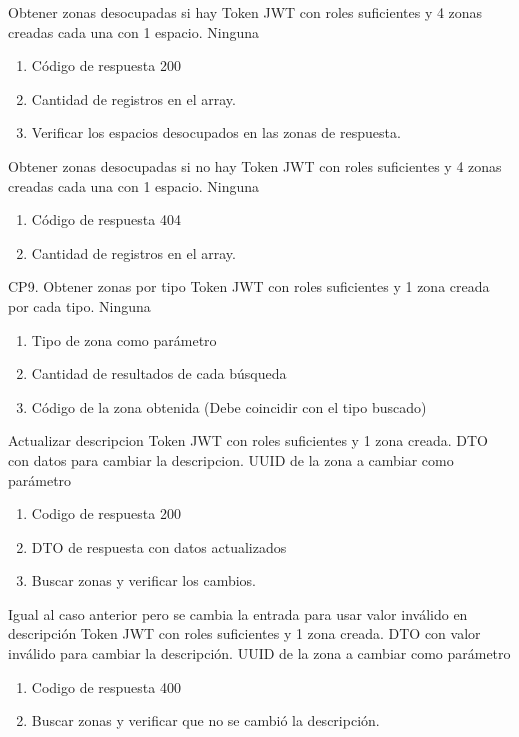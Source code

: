 {Obtener zonas desocupadas si hay}
{Token JWT con roles suficientes y 4 zonas creadas cada una con 1 espacio.}
{Ninguna}
{\begin{enumerate} [leftmargin=*, nosep]
    \item Código de respuesta 200
    \item Cantidad de registros en el array.
    \item Verificar los espacios desocupados en las zonas de respuesta.
\end{enumerate}}

{Obtener zonas desocupadas si no hay}
{Token JWT con roles suficientes y 4 zonas creadas cada una con 1 espacio.}
{Ninguna}
{\begin{enumerate} [leftmargin=*, nosep]
    \item Código de respuesta 404
    \item Cantidad de registros en el array.
\end{enumerate}}

{CP9. Obtener zonas por tipo}
{Token JWT con roles suficientes y 1 zona creada por cada tipo.}
{Ninguna}
{\begin{enumerate} [leftmargin=*, nosep]
    \item Tipo de zona como parámetro
    \item Cantidad de resultados de cada búsqueda
    \item Código de la zona obtenida (Debe coincidir con el tipo buscado)
\end{enumerate}}

{Actualizar descripcion}
{Token JWT con roles suficientes y 1 zona creada.}
{DTO con datos para cambiar la descripcion. UUID de la zona a cambiar como parámetro}
{\begin{enumerate} [leftmargin=*, nosep]
    \item Codigo de respuesta 200
    \item DTO de respuesta con datos actualizados
    \item Buscar zonas y verificar los cambios.
\end{enumerate}}

{Igual al caso anterior pero se cambia la entrada para usar valor inválido en descripción}
{Token JWT con roles suficientes y 1 zona creada.}
{DTO con valor inválido para cambiar la descripción. UUID de la zona a cambiar como parámetro}
{\begin{enumerate} [leftmargin=*, nosep]
    \item Codigo de respuesta 400
    \item Buscar zonas y verificar que no se cambió la descripción.
\end{enumerate}}

